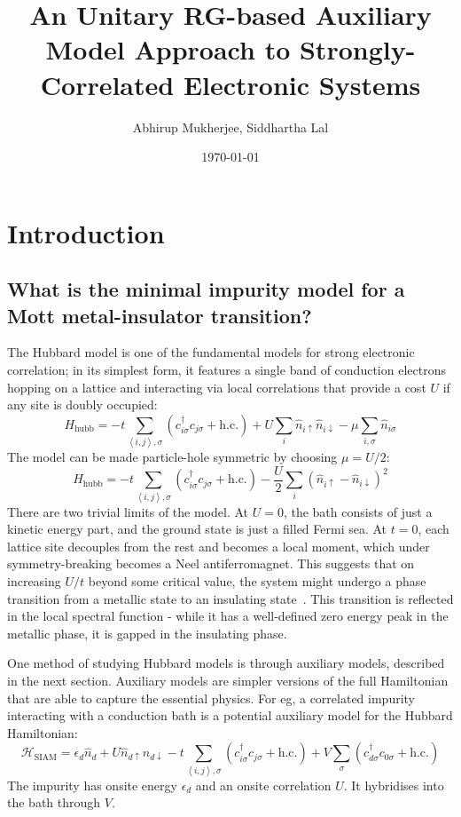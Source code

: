 \documentclass{report}
\title{\bf An Unitary RG-based Auxiliary Model Approach to Strongly-Correlated Electronic Systems}
\author{Abhirup Mukherjee, Siddhartha Lal}
\affil{Indian Institute of Science Education and Research Kolkata, Mohanpur}
\date{\today}
\numberwithin{equation}{section}
\begin{document}
\maketitle
\tableofcontents
\newpage
\chapter{Introduction}

\section{What is the minimal impurity model for a Mott metal-insulator transition?}
\label{sec:min_model}
The Hubbard model is one of the fundamental models for strong electronic correlation; in its simplest form, it features a single band of conduction electrons hopping on a lattice and interacting via local correlations that provide a cost \(U\) if any site is doubly occupied:
\[H_\text{hubb} = -t\sum_{\left<i,j \right>,\sigma}\left(c^\dagger_{i\sigma}c_{j\sigma}+\text{h.c.}\right) + U\sum_i \hat n_{i \uparrow} \hat n_{i \downarrow} - \mu \sum_{i,\sigma}\hat n_{i\sigma}\]
The model can be made particle-hole symmetric by choosing \(\mu = U/2\):
\[H_\text{hubb} = -t\sum_{\left<i,j \right>,\sigma}\left(c^\dagger_{i\sigma}c_{j\sigma}+\text{h.c.}\right) - \frac{U}{2}\sum_i \left(\hat n_{i \uparrow} - \hat n_{i \downarrow}\right)^2\]
There are two trivial limits of the model. At \(U=0\), the bath consists of just a kinetic energy part, and the ground state is just a filled Fermi sea. At \(t=0\), each lattice site decouples from the rest and becomes a local moment, which under symmetry-breaking becomes a Neel antiferromagnet. This suggests that on increasing \(U/t\) beyond some critical value, the system might undergo a phase transition from a metallic state to an insulating state~\cite{Mott_1949}. This transition is reflected in the local spectral function - while it has a well-defined zero energy peak in the metallic phase, it is gapped in the insulating phase.

One method of studying Hubbard models is through auxiliary models, described in the next section. Auxiliary models are simpler versions of the full Hamiltonian that are able to capture the essential physics. For eg, a correlated impurity interacting with a conduction bath is a potential auxiliary model for the Hubbard Hamiltonian:
\begin{equation}
\label{clus_bath_siam}
\mathcal{H}_\text{SIAM} = \epsilon_d \hat n_d + U \hat n_{d \uparrow} \hat n_{d \downarrow} - t\sum_{\left<i,j \right>, \sigma}\left(c^\dagger_{i\sigma}c_{j\sigma} + \text{h.c.}\right) + V\sum_\sigma \left( c^\dagger_{d\sigma}c_{0\sigma} + \text{h.c.}\right) 
\end{equation}
The impurity has onsite energy \(\epsilon_d\) and an onsite correlation \(U\). It hybridises into the bath through \(V\).
\end{document}
